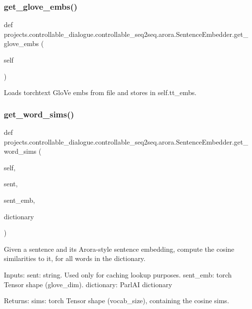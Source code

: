 \subsubsection{\texorpdfstring{get\+\_\+glove\+\_\+embs()}{get\_glove\_embs()}}
{\footnotesize\ttfamily def projects.\+controllable\+\_\+dialogue.\+controllable\+\_\+seq2seq.\+arora.\+Sentence\+Embedder.\+get\+\_\+glove\+\_\+embs (\begin{DoxyParamCaption}\item[{}]{self }\end{DoxyParamCaption})}

\begin{DoxyVerb}Loads torchtext GloVe embs from file and stores in self.tt_embs.
\end{DoxyVerb}
 \mbox{\label{classprojects_1_1controllable__dialogue_1_1controllable__seq2seq_1_1arora_1_1SentenceEmbedder_aec75badae47460e90dbb704867ac7279}} 
\subsubsection{\texorpdfstring{get\+\_\+word\+\_\+sims()}{get\_word\_sims()}}
{\footnotesize\ttfamily def projects.\+controllable\+\_\+dialogue.\+controllable\+\_\+seq2seq.\+arora.\+Sentence\+Embedder.\+get\+\_\+word\+\_\+sims (\begin{DoxyParamCaption}\item[{}]{self,  }\item[{}]{sent,  }\item[{}]{sent\+\_\+emb,  }\item[{}]{dictionary }\end{DoxyParamCaption})}

\begin{DoxyVerb}Given a sentence and its Arora-style sentence embedding, compute the cosine
similarities to it, for all words in the dictionary.

Inputs:
  sent: string. Used only for caching lookup purposes.
  sent_emb: torch Tensor shape (glove_dim).
  dictionary: ParlAI dictionary

Returns:
  sims: torch Tensor shape (vocab_size), containing the cosine sims.
\end{DoxyVerb}
 

